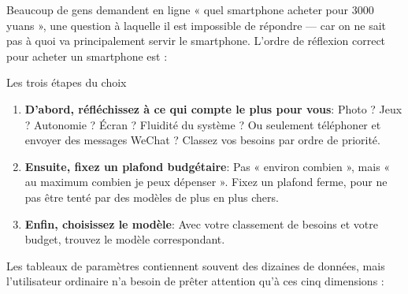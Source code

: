 


Beaucoup de gens demandent en ligne « quel smartphone acheter pour 3000 yuans », une question à laquelle il est impossible de répondre — car on ne sait pas à quoi va principalement servir le smartphone. L'ordre de réflexion correct pour acheter un smartphone est :

\begin{tcbinfo}{Les trois étapes du choix}
\begin{enumerate}
  \item \textbf{D'abord, réfléchissez à ce qui compte le plus pour vous}: Photo ? Jeux ? Autonomie ? Écran ? Fluidité du système ? Ou seulement téléphoner et envoyer des messages WeChat ? Classez vos besoins par ordre de priorité.
  \item \textbf{Ensuite, fixez un plafond budgétaire}: Pas « environ combien », mais « au maximum combien je peux dépenser ». Fixez un plafond ferme, pour ne pas être tenté par des modèles de plus en plus chers.
  \item \textbf{Enfin, choisissez le modèle}: Avec votre classement de besoins et votre budget, trouvez le modèle correspondant.
\end{enumerate}

\end{tcbinfo}


Les tableaux de paramètres contiennent souvent des dizaines de données, mais l'utilisateur ordinaire n'a besoin de prêter attention qu'à ces cinq dimensions :

